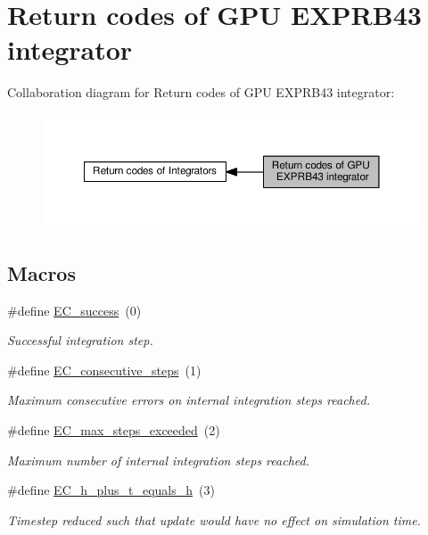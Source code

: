 \hypertarget{group__exp4cu__ErrCodes}{}\section{Return codes of G\+PU E\+X\+P\+R\+B43 integrator}
\label{group__exp4cu__ErrCodes}
Collaboration diagram for Return codes of G\+PU E\+X\+P\+R\+B43 integrator\+:\nopagebreak
\begin{figure}[H]
\begin{center}
\leavevmode
\includegraphics[width=350pt]{group__exp4cu__ErrCodes}
\end{center}
\end{figure}
\subsection*{Macros}
\begin{DoxyCompactItemize}
\item 
\#define \hyperlink{group__exp4cu__ErrCodes_gabd83bc0f9f475a2189a4db4a08b790ca}{E\+C\+\_\+success}~(0)
\begin{DoxyCompactList}\small\item\em Successful integration step. \end{DoxyCompactList}\item 
\#define \hyperlink{group__exp4cu__ErrCodes_gae0287841c08f86f5709660fd731615ad}{E\+C\+\_\+consecutive\+\_\+steps}~(1)
\begin{DoxyCompactList}\small\item\em Maximum consecutive errors on internal integration steps reached. \end{DoxyCompactList}\item 
\#define \hyperlink{group__exp4cu__ErrCodes_ga0f0275d9851ab5c19b79a963d5084df3}{E\+C\+\_\+max\+\_\+steps\+\_\+exceeded}~(2)
\begin{DoxyCompactList}\small\item\em Maximum number of internal integration steps reached. \end{DoxyCompactList}\item 
\#define \hyperlink{group__exp4cu__ErrCodes_ga9326efd544880e2683c4453365ca2704}{E\+C\+\_\+h\+\_\+plus\+\_\+t\+\_\+equals\+\_\+h}~(3)
\begin{DoxyCompactList}\small\item\em Timestep reduced such that update would have no effect on simulation time. \end{DoxyCompactList}\end{DoxyCompactItemize}


